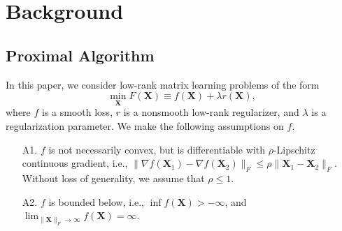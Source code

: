 \documentclass[10pt,journal,compsoc]{IEEEtran}
\newcommand{\X}{\mathbf{X}}
\newcommand{\NM}[2]{\| #1 \|_{#2} }
\newcommand{\f}[1]{f(#1)}
\begin{document}

\section{Background}
\label{sec:review}


\subsection{Proximal Algorithm}
\label{sec:prox}

In this paper, 
we consider 
low-rank matrix learning 
problems  of the form
\begin{equation}
\label{eq:problem}
\min_{\X} F(\X) \equiv f(\X) + \lambda r(\X),
\end{equation} 
where $f$ is a smooth loss, $r$ is a nonsmooth
low-rank regularizer, and 
$\lambda$ is a regularization parameter.
We make the following assumptions on $f$.
\begin{itemize}
\item[A1.] $f$ is not necessarily convex, but is differentiable with $\rho$-Lipschitz continuous
gradient, i.e., $\NM{\nabla \f{\X_1} - \nabla \f{\X_2}}{F} \le \rho \NM{\X_1 - \X_2}{F}$.
Without loss of generality, we assume that $\rho \le 1$.

\item[A2.] $f$ is bounded below, i.e., $\inf \f{\X} > -\infty$,
and $\lim_{\NM{\X}{F} \rightarrow \infty} f(\X) = \infty$.
\end{itemize}
\end{document}
